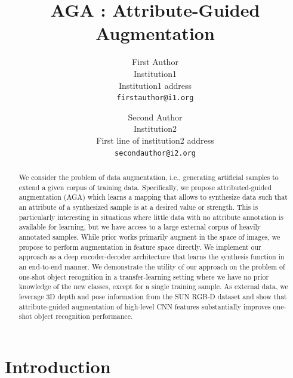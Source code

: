 \documentclass[10pt,twocolumn,letterpaper]{article}
\begin{document}
\title{AGA : Attribute-Guided Augmentation}

\author{First Author\\
Institution1\\
Institution1 address\\
{\tt\small firstauthor@i1.org}
\and
Second Author\\
Institution2\\
First line of institution2 address\\
{\tt\small secondauthor@i2.org}
}

\maketitle

\begin{abstract}
We consider the problem of data augmentation, i.e., generating artificial
samples to extend a given corpus of training data. Specifically, we propose
attributed-guided augmentation (AGA) which learns a mapping
that allows to synthesize data such that an attribute of a synthesized sample 
is at a desired value or strength. This is particularly interesting in situations 
where little data with no attribute annotation is available for learning, but 
we have access to a large external corpus of heavily annotated samples. 
While prior works primarily augment in the space of images,
we propose to perform augmentation in feature space directly.
We implement our approach as a deep encoder-decoder architecture that 
learns the synthesis function in an end-to-end manner. 
We demonstrate the utility of our approach on the problem of 
one-shot object recognition in a transfer-learning setting where
we have no prior knowledge of the new classes, except for 
a single training sample.
As external data, we leverage 3D depth and pose information from the 
SUN RGB-D dataset and show that attribute-guided augmentation of
high-level CNN features substantially improves one-shot object recognition 
performance.
\end{abstract}

\section{Introduction}
\label{section:introduction}
\end{document}
